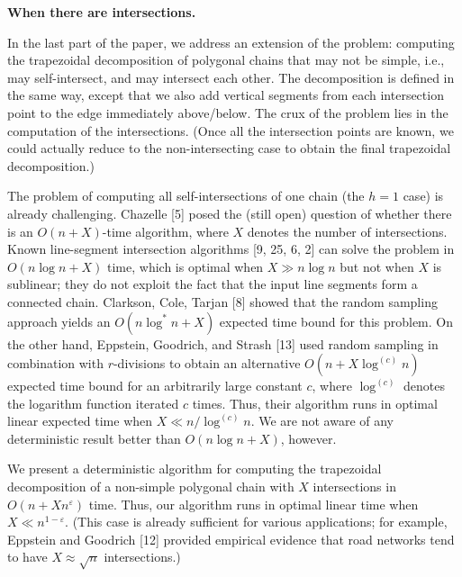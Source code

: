 \documentclass[10pt,a4paper]{article}
\begin{document}
\par
\par
\par\medskip\noindent\textbf{When there are intersections.}\par
In the last part of the paper, we address an extension of the problem: computing the trapezoidal decomposition of polygonal chains that may not be simple, i.e., may self-intersect, and may intersect each other. The decomposition is defined in the same way, except that we also add vertical segments from each intersection point to the edge immediately above/below. The crux of the problem lies in the computation of the intersections. (Once all the intersection points are known, we could actually reduce to the non-intersecting case to obtain the final trapezoidal decomposition.)
\par
\par
The problem of computing all self-intersections of one chain (the $h=1$ case) is already challenging. Chazelle [5] posed the (still open) question of whether there is an $O(n+X)$-time algorithm, where $X$ denotes the number of intersections. Known line-segment intersection algorithms [9, 25, 6, 2] can solve the problem in $O(n\log n+X)$ time, which is optimal when $X\gg n\log n$ but not when $X$ is sublinear; they do not exploit the fact that the input line segments form a connected chain. Clarkson, Cole, Tarjan [8] showed that the random sampling approach yields an $O(n\log^{*}n+X)$ expected time bound for this problem. On the other hand, Eppstein, Goodrich, and Strash [13] used random sampling in combination with $r$-divisions to obtain an alternative $O(n+X\log^{(c)}n)$ expected time bound for an arbitrarily large constant $c$, where $\log^{(c)}$ denotes the logarithm function iterated $c$ times. Thus, their algorithm runs in optimal linear expected time when $X\ll n/\log^{(c)}n$. We are not aware of any deterministic result better than $O(n\log n+X)$, however.
\par
\par
We present a deterministic algorithm for computing the trapezoidal decomposition of a non-simple polygonal chain with $X$ intersections in $O(n+Xn^{\varepsilon})$ time. Thus, our algorithm runs in optimal linear time when $X\ll n^{1-\varepsilon}$. (This case is already sufficient for various applications; for example, Eppstein and Goodrich [12] provided empirical evidence that road networks tend to have $X\approx\sqrt{n}$ intersections.)
\end{document}

